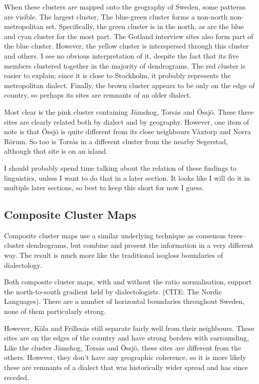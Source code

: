 When these clusters are mapped onto the geography of Sweden, some
patterns are visible. The largest cluster, The blue-green cluster
forms a non-north non-metropolitan set. Specifically, the green
cluster is in the north, as are the blue and cyan cluster for the most
part. The Gotland interview sites also form part of the blue
cluster. However, the yellow cluster is interspersed through this
cluster and others. I see no obvious interpretation of it, despite the
fact that its five members clustered together in the majority of
dendrograms. The red cluster is easier to explain; since it is close
to Stockholm, it probably represents the metropolitan
dialect. Finally, the brown cluster appears to be only on the edge of
country, so perhaps its sites are remnants of an older dialect.

Most clear is the pink cluster containing J\"amshog, Tors\.as and
\"Ossj\"o. These three sites are clearly related both by dialect and
by geography. However, one item of note is that \"Ossj\"o is quite
different from its close neighbours V\"axtorp and Norra R\"orum. So
too is Tors\.as in a different cluster from the nearby Segerstad,
although that site is on an island.

I should probably spend time talking about the relation of these
findings to linguistics, unless I want to do that in a later
section. It looks like I will do it in multiple later sections, so
best to keep this short for now I guess.

\subsection{Composite Cluster Maps}

Composite cluster maps use a similar underlying technique as consensus
trees--cluster dendrograms, but combine and present the information in
a very different way. The result is much more like the traditional
isogloss boundaries of dialectology.

Both composite cluster maps, with and without the ratio normalisation,
support the north-to-south gradient held by dialectologists. (CITE:
The Nordic Languages). There are a number of horizontal boundaries
throughout Sweden, none of them particularly strong.

However, K\"ola and Frilles\.as still separate fairly well from their
neighbours. These sites are on the edges of the country and have strong borders
with surrounding, Like the cluster J\"amshog, Tors\.as and \"Ossj\"o,
these sites are different from the others. However, they don't have
any geographic coherence, so it is more likely these are remnants of a
dialect that was historically wider spread and has since receded.

